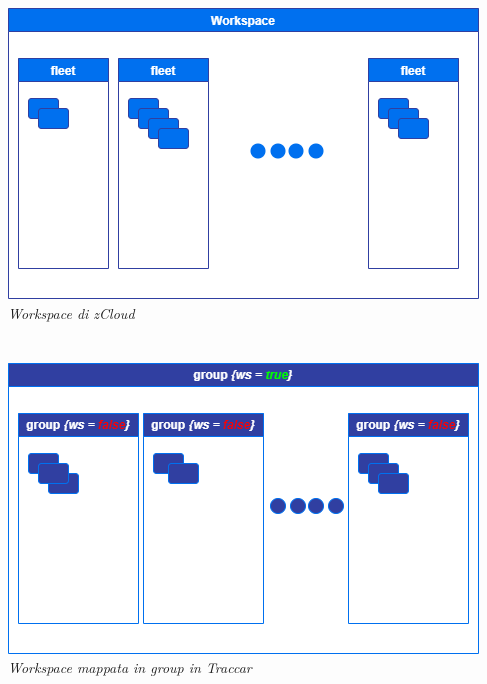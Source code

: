 \documentclass[a4paper,titlepage,12pt]{book}
\begin{document}
\section*{}
\begin{center}
\includegraphics[scale=0.6]{images/zc_ws.png}\\ 
\textit{Workspace di zCloud}\\
\section*{}
\includegraphics[scale=0.6]{images/traccar_ws.png} \\
\textit{Workspace mappata in group in Traccar}


\end{center}
\end{document}
